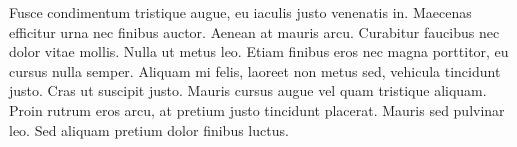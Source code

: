 Fusce condimentum tristique augue, eu iaculis justo venenatis in. Maecenas efficitur urna nec finibus auctor. Aenean at mauris arcu. Curabitur faucibus nec dolor vitae mollis. Nulla ut metus leo. Etiam finibus eros nec magna porttitor, eu cursus nulla semper. Aliquam mi felis, laoreet non metus sed, vehicula tincidunt justo. Cras ut suscipit justo. Mauris cursus augue vel quam tristique aliquam. Proin rutrum eros arcu, at pretium justo tincidunt placerat. Mauris sed pulvinar leo. Sed aliquam pretium dolor finibus luctus.


